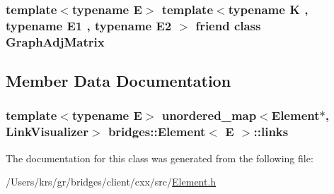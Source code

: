 \subsubsection[{Graph\+Adj\+Matrix}]{\setlength{\rightskip}{0pt plus 5cm}template$<$typename E$>$ template$<$typename K , typename E1 , typename E2 $>$ friend class {\bf Graph\+Adj\+Matrix}\hspace{0.3cm}{\ttfamily [friend]}}\label{classbridges_1_1_element_a1935808473b7eb8ff54149c5436c3ac9}


\subsection{Member Data Documentation}
\hypertarget{classbridges_1_1_element_a6fb53728edc378f26238543b26238496}{}
\subsubsection[{links}]{\setlength{\rightskip}{0pt plus 5cm}template$<$typename E$>$ unordered\+\_\+map$<${\bf Element}$\ast$, {\bf Link\+Visualizer}$>$ {\bf bridges\+::\+Element}$<$ E $>$\+::links\hspace{0.3cm}{\ttfamily [protected]}}\label{classbridges_1_1_element_a6fb53728edc378f26238543b26238496}


The documentation for this class was generated from the following file\+:\begin{DoxyCompactItemize}
\item 
/\+Users/krs/gr/bridges/client/cxx/src/\hyperlink{_element_8h}{Element.\+h}\end{DoxyCompactItemize}
